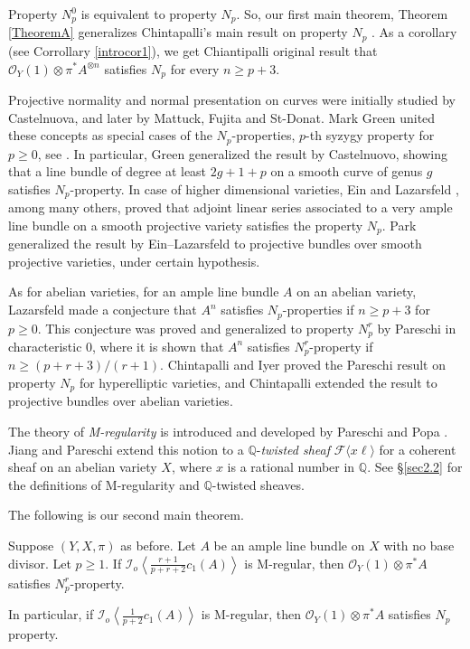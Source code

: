 \documentclass[11pt,letter]{amsart}
\numberwithin{equation}{section}
\begin{document}
  
Property $N_p^0$ is equivalent to property $N_p$. So, our first main theorem, Theorem \ref{TheoremA} generalizes Chintapalli's main result on property $N_p$ \cite[Theorem 1.2]{Chi19}. As a corollary (see Corrollary \ref{introcor1}), we get Chiantipalli original result that $\mathcal{O}_Y(1)\otimes\pi^* A^{\otimes n}$ satisfies $N_p$ for every $n\geq p+3$.
    
    
  
Projective normality and normal presentation on curves were initially studied by Castelnuova, and later by Mattuck, Fujita and St-Donat. Mark Green united these concepts as special cases of the $N_p$-properties, $p$-th syzygy property for $p\geq 0$,   see \cite{green1984koszul,GreenII,GreenIII}. In particular, Green generalized the result by Castelnuovo, showing that a line bundle of degree at least $2g+1+p$ on a smooth curve of genus $g$ satisfies $N_p$-property. In case of higher dimensional varieties, Ein and Lazarsfeld \cite{EL}, among many others, proved that adjoint linear series associated to a very ample line bundle on a smooth projective variety satisfies the property $N_p$. Park \cite{Park} generalized the result by Ein--Lazarsfeld to projective bundles over smooth projective varieties, under certain hypothesis.
  
  As for abelian varieties, for an ample line bundle $A$ on an abelian variety,  Lazarsfeld made a conjecture that $A^n$ satisfies $N_p$-properties if $n\geq p+3$ for $p\geq 0$. This conjecture was proved and generalized to property $N_p^r$ by Pareschi \cite{pareschi2000syzygies} in characteristic $0$, where it is shown that $A^n$ satisfies $N_p^r$-property if $n\geq (p+r+3)/(r+1)$. Chintapalli and Iyer \cite{ChiIyer} proved the Pareschi result on property $N_p$ for hyperelliptic varieties, and Chintapalli \cite[Theorem 1.2]{Chi19} extended the result to projective bundles over abelian varieties. 
  
  
 The theory of {\it M-regularity} is introduced and developed by Pareschi and Popa \cite{PP03,PP04,PP11}. Jiang and Pareschi \cite{JiPa2020} extend this notion to a $\mathbb{Q}$-{\it twisted sheaf} $\mathcal{F}\langle x\ell\rangle$ for a coherent sheaf on an abelian variety $X$, where $x$ is a rational number in $\mathbb{Q}$. See \S\ref{sec2.2} for the definitions of M-regularity and $\mathbb{Q}$-twisted sheaves. 
  
  The following is our second main theorem.  

\begin{introthm}\label{TheoremC}
Suppose $(Y,X,\pi)$ as before. 
Let $A$ be an ample line bundle on $X$ with no base divisor. Let $p\geq 1$.
 If $\mathcal{I}_o\left\langle \frac{r+1}{p+r+2}c_1(A)\right\rangle$ is M-regular, then $\mathcal{O}_Y(1)\otimes\pi^*A$ satisfies $N_p^r$-property.  
 
 In particular, if $\mathcal{I}_o\left\langle \frac{1}{p+2}c_1(A)\right\rangle$ is M-regular, then $\mathcal{O}_Y(1)\otimes\pi^*A$ satisfies $N_p$ property. 
\end{introthm}
\end{document}
